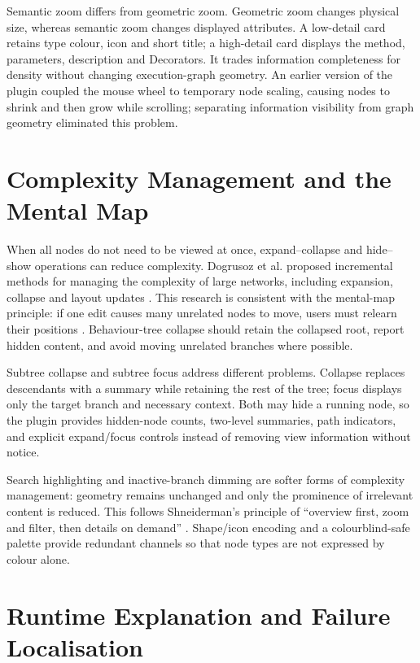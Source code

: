 Semantic zoom differs from geometric zoom. Geometric zoom changes physical size, whereas semantic zoom changes displayed attributes. A low-detail card retains type colour, icon and short title; a high-detail card displays the method, parameters, description and Decorators. It trades information completeness for density without changing execution-graph geometry. An earlier version of the plugin coupled the mouse wheel to temporary node scaling, causing nodes to shrink and then grow while scrolling; separating information visibility from graph geometry eliminated this problem.

\section{Complexity Management and the Mental Map}

When all nodes do not need to be viewed at once, expand--collapse and hide--show operations can reduce complexity. Dogrusoz et al. proposed incremental methods for managing the complexity of large networks, including expansion, collapse and layout updates \parencite{dogrusoz2018complexity}. This research is consistent with the mental-map principle: if one edit causes many unrelated nodes to move, users must relearn their positions \parencite{misue1995mentalmap}. Behaviour-tree collapse should retain the collapsed root, report hidden content, and avoid moving unrelated branches where possible.

Subtree collapse and subtree focus address different problems. Collapse replaces descendants with a summary while retaining the rest of the tree; focus displays only the target branch and necessary context. Both may hide a running node, so the plugin provides hidden-node counts, two-level summaries, path indicators, and explicit expand/focus controls instead of removing view information without notice.

Search highlighting and inactive-branch dimming are softer forms of complexity management: geometry remains unchanged and only the prominence of irrelevant content is reduced. This follows Shneiderman's principle of ``overview first, zoom and filter, then details on demand'' \parencite{shneiderman1996eyes}. Shape/icon encoding and a colourblind-safe palette provide redundant channels so that node types are not expressed by colour alone.

\section{Runtime Explanation and Failure Localisation}

